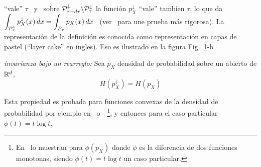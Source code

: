 ``vale''   $\tau$   \   y   \   sobre   $\P_{\tau+d\tau}^\downarrow   \backslash
\P_\tau^\downarrow$  la funci\'on $p_X^\downarrow$  ``vale'' tambien  $\tau$, lo
que  da \  $\displaystyle  \int_{\P_\tau^\downarrow} p_X^\downarrow(x)  \, dx  =
\int_{\P_\tau} p_X(x)  \, dx$ \  (ver~\cite{LieLos01, WanMad04} para  une prueba
m\'as  rigorosa).   La representaci\'on  de  la  definici\'on  es conocida  como
representaci\'on  en  capas  de  pastel  (``layer cake''  en  ingles).   Eso  es
ilustrado en la figura Fig.~\ref{fig:SZ:ensemblerearreglado}-b
  \begin{figure}[h!]
  \begin{center}  \end{center}
  \label{fig:SZ:ensemblerearreglado}
  \end{figure}

\begin{propiedadesC}\setcounter{enumi}{\value{PropPermutacion}}
\item\label{prop:SZ:permutacionC} {\it invarianza  bajo un rearreglo:} Sea $p_X$
  densidad   de  probabilidad   sobre   un  abierto   de  $\Rset^d$,
  \[
  H\left( p_X^\downarrow \right) = H(p_X)
  \]
\end{propiedadesC}
%
\noindent Esta  propiedad es probada para  funciones convexas de  la densidad de
probabilidad              por             ejemplo             en~\cite{LieLos01}
o~\cite[Lema~7.2]{WanMad04}~\footnote{En~\cite[Sec.~3.3]{LieLos01}  lo  muestran
  para $\phi(p_X)$  donde $\phi$  es la diferencia  de dos  funciones monotonas,
  siendo $\phi(t)  = t  \log t$ un  caso particular.},  y entonces para  el caso
particular $\phi(t) = t \log t$.

